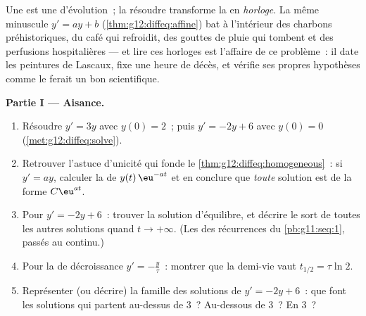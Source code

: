 \begin{problem}
\label{pb:g12:diffeq:1}
Une  est une  d'évolution~; la résoudre
transforme la  en \emph{horloge}. La même minuscule 
$y' = ay + b$ (\cref{thm:g12:diffeq:affine}) bat à l'intérieur des
charbons préhistoriques, du café qui refroidit, des gouttes de pluie
qui tombent et des perfusions hospitalières --- et lire ces horloges
est l'affaire de ce problème~: il date les peintures de Lascaux,
fixe une heure de décès, et vérifie ses propres hypothèses comme le
ferait un bon scientifique.

\medskip
\noindent\textbf{Partie I --- Aisance.}
\begin{enumerate}
  \item Résoudre $y' = 3y$ avec $y(0) = 2$~; puis
        $y' = -2y + 6$ avec $y(0) = 0$
        (\cref{met:g12:diffeq:solve}).
  \item Retrouver l'astuce d'unicité qui fonde le
        \cref{thm:g12:diffeq:homogeneous}~: si $y' = ay$, calculer
        la  de $y(t)\,\eu^{-at}$ et en conclure que
        \emph{toute} solution est de la forme $C\eu^{at}$.
  \item Pour $y' = -2y + 6$~: trouver la solution d'équilibre, et
        décrire le sort de toutes les autres solutions quand
        $t \to +\infty$. (Les  des récurrences du
        \cref{pb:g11:seq:1}, passés au continu.)
  \item Pour la  de décroissance $y' = -\frac{y}{\tau}$~:
        montrer que la demi-vie vaut $t_{1/2} = \tau \ln 2$.
  \item Représenter (ou décrire) la famille des solutions de
        $y' = -2y + 6$~: que font les solutions qui partent
        au-dessus de $3$~? Au-dessous de $3$~? En $3$~?
\end{enumerate}


\end{problem}
